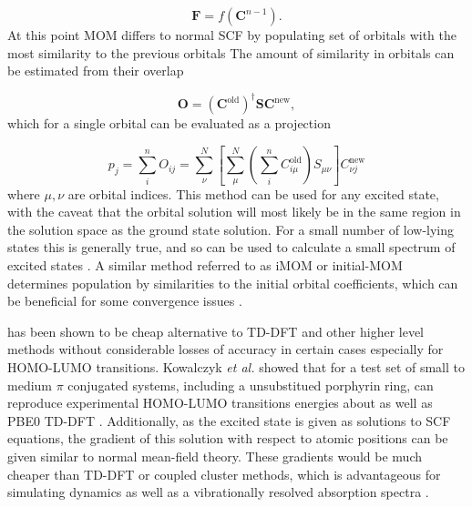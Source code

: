 \begin{equation}
\mathbf{F} = f\left(\mathbf{C}^{n-1}\right).
\end{equation}
%
At this point MOM differs to normal SCF by populating set of orbitals with the most
similarity to the previous orbitals The amount of similarity in orbitals can be
estimated from their overlap

\begin{equation}
\mathbf{O} = \left(\mathbf{C}^{\text{old}}\right)^\dagger \mathbf{S} \mathbf{C}^{\text{new}},
\end{equation}
%
which for a single orbital can be evaluated as a projection

\begin{equation}
p_j = \sum^n_i O_{ij} = \sum^N_\nu \left[\sum^N_\mu\left(\sum^n_i C_{i\mu}^{\text{old}}\right)S_{\mu\nu}\right]C^{\text{new}}_{\nu j}
\end{equation}
%
where $\mu,\nu$ are orbital indices. This method can be used for any excited state,
with the caveat that the orbital solution will most likely be in the same region
in the solution space as the ground state solution. For a small number of low-lying
states this is generally true, and so \dscf can be used to calculate a small spectrum 
of excited states \cite{Gilbert2008}. A similar method referred to as iMOM or initial-MOM
determines population by similarities to the initial orbital coefficients, which 
can be beneficial for some convergence issues \cite{Barca2018}.

\dscf has been shown to be cheap alternative to TD-DFT and other higher level methods 
\cite{Liu2004, Gavnholt2008, Besley2009} without considerable losses of accuracy 
in certain cases especially for HOMO-LUMO transitions. Kowalczyk \emph{et al.} showed 
that for a test set of small to medium $\pi$ conjugated systems, including a unsubstitued
porphyrin ring, \dscf can reproduce experimental HOMO-LUMO transitions energies 
about as well as PBE0 TD-DFT \cite{Kowalczyk2011}. Additionally, as the excited 
state is given as solutions to SCF equations, the gradient of this solution with 
respect to atomic positions can be given similar to normal mean-field theory. These
gradients would be much cheaper than TD-DFT or coupled cluster methods, which is
advantageous for simulating dynamics \cite{Gavnholt2008} as well as a vibrationally 
resolved absorption spectra \cite{Kowalczyk2011}.


